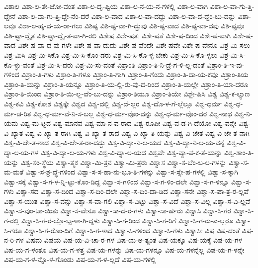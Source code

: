 {ವಿಶಾಲ
ವಿಶಾ-ಲ-ತೇ-ಜೋ-ವಂತ
ವಿಶಾ-ಲ-ದೃ-ಷ್ಟಿಯ
ವಿಶಾ-ಲ-ನ-ಯ-ನ-ಗಳಲ್ಲಿ
ವಿಶಾ-ಲ-ವಾಗಿ
ವಿಶಾ-ಲ-ವಾ-ಗು-ತ್ತಿ-ದ್ದೇನೆ
ವಿಶಾ-ಲ-ವಾ-ಗು-ತ್ತಿ-ದ್ದೇ-ನೆಂ-ದರೆ
ವಿಶಾ-ಲ-ವಾದ
ವಿಶಾ-ಲ-ವಾ-ದದ್ದು
ವಿಶಾ-ಲ-ವಾ-ದ-ದ್ದೆಂ-ಬು-ದನ್ನು
ವಿಶಾ-ಲವೂ
ವಿಶಾ-ಲ-ಹೃ-ದ-ಯ-ರಾ-ಗಲು
ವಿಶಿಷ್ಟ
ವಿಶಿ-ಷ್ಟ-ವಾ-ಗಿ-ದ್ದುವು
ವಿಶಿ-ಷ್ಟ-ವಾದ
ವಿಶಿ-ಷ್ಟ-ವಾ-ದವು
ವಿಶಿ-ಷ್ಟವೂ
ವಿಶಿ-ಷ್ಟಾ-ದ್ವೈತ
ವಿಶಿ-ಷ್ಟಾ-ದ್ವೈ-ತ-ವಾ-ಗಿ-ರಲಿ
ವಿಶೇಷ
ವಿಶೇ-ಷತಃ
ವಿಶೇ-ಷತೆ
ವಿಶೇ-ಷ-ದಿಂದ
ವಿಶೇ-ಷ-ವಾಗಿ
ವಿಶೇ-ಷ-ವಾದ
ವಿಶೇ-ಷ-ವಾ-ದ-ವು-ಗಳೇ
ವಿಶೇ-ಷ-ವಾ-ದುದು
ವಿಶೇ-ಷ-ವೆಂದೇ
ವಿಶೇ-ಷವೇ
ವಿಶೇ-ಷ-ವೇನೂ
ವಿಶ್ರ-ಮಿ-ಸಲು
ವಿಶ್ರ-ಮಿಸಿ
ವಿಶ್ರ-ಮಿ-ಸಿಕೊ
ವಿಶ್ರ-ಮಿ-ಸಿ-ಕೊಂ-ಡರು
ವಿಶ್ರ-ಮಿ-ಸಿ-ಕೊ-ಳ್ಳ-ಬೇಕು
ವಿಶ್ರ-ಮಿ-ಸಿ-ಕೊ-ಳ್ಳಲು
ವಿಶ್ರ-ಮಿ-ಸಿ-ಕೊ-ಳ್ಳು-ವಂತೆ
ವಿಶ್ರ-ಮಿ-ಸಿ-ದರು
ವಿಶ್ರ-ಮಿ-ಸು-ವಂತೆ
ವಿಶ್ರಾಂತಿ
ವಿಶ್ರಾಂ-ತಿ-ನಿ-ದ್ರೆ-ಗ-ಳಿ-ಲ್ಲ-ದಂತೆ
ವಿಶ್ರಾಂ-ತಿ-ಇ-ವು-ಗಳಿಂದ
ವಿಶ್ರಾಂ-ತಿ-ಗಳು
ವಿಶ್ರಾಂ-ತಿ-ಗಳೂ
ವಿಶ್ರಾಂ-ತಿ-ಗಾಗಿ
ವಿಶ್ರಾಂ-ತಿ-ಗೆಂದು
ವಿಶ್ರಾಂ-ತಿ-ದಾ-ಯ-ಕವೂ
ವಿಶ್ರಾಂ-ತಿಯ
ವಿಶ್ರಾಂ-ತಿ-ಯನ್ನು
ವಿಶ್ರಾಂ-ತಿ-ಯನ್ನೂ
ವಿಶ್ರಾಂ-ತಿ-ಯ-ಲ್ಲಿ-ರು-ವು-ದ-ರಿಂದ
ವಿಶ್ರಾಂ-ತಿ-ಯಲ್ಲೇ
ವಿಶ್ರಾಂ-ತಿ-ಯಾ-ದರೂ
ವಿಶ್ರಾಂ-ತಿ-ಯಿಂದ
ವಿಶ್ರಾಂ-ತಿ-ಯಿ-ಲ್ಲ-ವೆಂ-ಬು-ದನ್ನು
ವಿಶ್ರಾಂ-ತಿಯೂ
ವಿಶ್ರಾಂ-ತಿಯೇ
ವಿಶ್ಲೇ-ಷಿಸಿ
ವಿಶ್ವ
ವಿಶ್ವ-ಕ-ಲ್ಯಾಣ
ವಿಶ್ವ-ಕವಿ
ವಿಶ್ವ-ಕೋಶ
ವಿಶ್ವಕ್ಕೇ
ವಿಶ್ವದ
ವಿಶ್ವ-ದಲ್ಲಿ
ವಿಶ್ವ-ದೆ-ಲ್ಲರ
ವಿಶ್ವ-ದೊ-ಳ-ಗೆ-ಲ್ಲೆಲ್ಲೂ
ವಿಶ್ವ-ಧರ್ಮ
ವಿಶ್ವ-ಧ-ರ್ಮ-ಚ-ರಿತ
ವಿಶ್ವ-ಧ-ರ್ಮ-ವೆ-ನಿ-ಸ-ಬಲ್ಲ
ವಿಶ್ವ-ಧ-ರ್ಮ-ವೊಂ-ದನ್ನು
ವಿಶ್ವ-ಧ-ರ್ಮ-ವೊಂ-ದರ
ವಿಶ್ವ-ನಾಥ
ವಿಶ್ವ-ನಿ-ಯಮ
ವಿಶ್ವ-ಮ-ಟ್ಟದ
ವಿಶ್ವ-ಮಾನವ
ವಿಶ್ವ-ಮಾ-ನ-ವ-ರಾದ
ವಿಶ್ವ-ರೂಪೀ
ವಿಶ್ವ-ವ-ಡ-ಗಿ-ದೆಯೋ
ವಿಶ್ವ-ವನ್ನೇ
ವಿಶ್ವ-ವಿ-ಖ್ಯಾತ
ವಿಶ್ವ-ವಿ-ಖ್ಯಾ-ತ-ರಾಗಿ
ವಿಶ್ವ-ವಿ-ಖ್ಯಾ-ತ-ರಾದ
ವಿಶ್ವ-ವಿ-ಖ್ಯಾ-ತಿ-ಯನ್ನು
ವಿಶ್ವ-ವಿ-ಜೇತ
ವಿಶ್ವ-ವಿ-ಜೇ-ತ-ನಾಗಿ
ವಿಶ್ವ-ವಿ-ಜೇ-ತ-ನಾದ
ವಿಶ್ವ-ವಿ-ಜೇ-ತ-ರಾ-ದದ್ದು
ವಿಶ್ವ-ವಿ-ದ್ಯಾ-ನಿ-ಲ-ಯದ
ವಿಶ್ವ-ವಿ-ದ್ಯಾ-ನಿ-ಲ-ಯ-ವನ್ನೆ
ವಿಶ್ವ-ವಿ-ದ್ಯಾ-ಲ-ಯ-ಗಳ
ವಿಶ್ವ-ವಿ-ದ್ಯಾ-ಲ-ಯ-ಗಳು
ವಿಶ್ವ-ವಿ-ದ್ಯಾ-ಲ-ಯದ
ವಿಶ್ವವೇ
ವಿಶ್ವ-ವ್ಯಾ-ಪ-ಕ-ತೆ-ಯನ್ನು
ವಿಶ್ವ-ಶಾಂ-ತಿ-ಯನ್ನು
ವಿಶ್ವ-ಸಂ-ಸ್ಥೆಯ
ವಿಶ್ವಾ-ತ್ಮಕ
ವಿಶ್ವಾ-ಮಿ-ತ್ರನ
ವಿಶ್ವಾ-ಮಿ-ತ್ರರು
ವಿಶ್ವಾಸ
ವಿಶ್ವಾ-ಸ-ಬೆಂ-ಬ-ಲ-ಗಳನ್ನು
ವಿಶ್ವಾ-ಸ-ಮ-ಮತೆ
ವಿಶ್ವಾ-ಸ-ಶ್ರ-ದ್ಧೆ-ಗಳಿಂದ
ವಿಶ್ವಾ-ಸ-ಸ-ಹಾ-ನು-ಭೂ-ತಿ-ಗಳನ್ನು
ವಿಶ್ವಾ-ಸ-ಸ್ನೇ-ಹ-ಗಳಲ್ಲಿ
ವಿಶ್ವಾ-ಸ-ಕ್ಕಾಗಿ
ವಿಶ್ವಾ-ಸಕ್ಕೆ
ವಿಶ್ವಾ-ಸ-ಗ-ಳ-ನ್ನಿ-ಟ್ಟು-ಕೊಂ-ಡಿದ್ದ
ವಿಶ್ವಾ-ಸ-ಗಳಿಂದ
ವಿಶ್ವಾ-ಸ-ಗ-ಳಿಂ-ದಲೇ
ವಿಶ್ವಾ-ಸ-ಗ-ಳಿನ್ನೂ
ವಿಶ್ವಾ-ಸ-ಗಳು
ವಿಶ್ವಾ-ಸದ
ವಿಶ್ವಾ-ಸ-ದಿಂದ
ವಿಶ್ವಾ-ಸ-ದಿಂ-ದಲೇ
ವಿಶ್ವಾ-ಸ-ದಿಂ-ದಾ-ಡಿದ
ವಿಶ್ವಾ-ಸನೇ
ವಿಶ್ವಾ-ಸ-ಪಾ-ತ್ರ-ರ-ಲ್ಲವೆ
ವಿಶ್ವಾ-ಸ-ಯುತ
ವಿಶ್ವಾ-ಸ-ವನ್ನು
ವಿಶ್ವಾ-ಸ-ವಾ-ಗಲಿ
ವಿಶ್ವಾ-ಸ-ವಿಟ್ಟು
ವಿಶ್ವಾ-ಸ-ವಿದೆ
ವಿಶ್ವಾ-ಸ-ವಿಲ್ಲ
ವಿಶ್ವಾ-ಸ-ವಿ-ಲ್ಲವೆ
ವಿಶ್ವಾ-ಸ-ವುಂ-ಟಾ-ಯಿತು
ವಿಶ್ವಾ-ಸ-ವೇನೂ
ವಿಶ್ವಾ-ಸಾ-ದ-ರ-ಗಳು
ವಿಶ್ವಾ-ಸಾ-ರ್ಹರು
ವಿಶ್ವಾಸಿ
ವಿಶ್ವಾ-ಸಿ-ಗರ
ವಿಶ್ವಾ-ಸಿ-ಗ-ರಲ್ಲಿ
ವಿಶ್ವಾ-ಸಿ-ಗ-ರ-ಲ್ಲೊ-ಬ್ಬ-ಳಾ-ಗಿ-ದ್ದಳು
ವಿಶ್ವಾ-ಸಿ-ಗ-ರಿಂದ
ವಿಶ್ವಾ-ಸಿ-ಗ-ರಿಗೆ
ವಿಶ್ವಾ-ಸಿ-ಗ-ರು-ಎ-ಲ್ಲರೂ
ವಿಶ್ವಾ-ಸಿ-ಗರೂ
ವಿಶ್ವಾ-ಸಿ-ಗ-ರೊಂ-ದಿಗೆ
ವಿಶ್ವಾ-ಸಿ-ಗ-ಳಾದ
ವಿಶ್ವಾ-ಸಿ-ಗಳಿಂದ
ವಿಶ್ವಾ-ಸಿ-ಗಳು
ವಿಶ್ವಾಸೀ
ವಿಷ
ವಿಷ-ದಂತೆ
ವಿಷ-ನ-ರಿ-ಗಳ
ವಿಷಮ
ವಿಷಯ
ವಿಷ-ಯ-ವಿ-ಚಾ-ರ-ಗಳ
ವಿಷ-ಯ-ಅ-ತ್ಯಂತ
ವಿಷ-ಯಕ್ಕೂ
ವಿಷ-ಯಕ್ಕೆ
ವಿಷ-ಯ-ಗಳ
ವಿಷ-ಯ-ಗ-ಳಂತೂ
ವಿಷ-ಯ-ಗ-ಳತ್ತ
ವಿಷ-ಯ-ಗಳನ್ನು
ವಿಷ-ಯ-ಗಳನ್ನೂ
ವಿಷ-ಯ-ಗಳನ್ನೆಲ್ಲ
ವಿಷ-ಯ-ಗ-ಳನ್ನೇ
ವಿಷ-ಯ-ಗ-ಳ-ನ್ನೊ-ಳ-ಗೊಂಡು
ವಿಷ-ಯ-ಗ-ಳ-ಲ್ಲದೆ
ವಿಷ-ಯ-ಗಳಲ್ಲಿ
}
